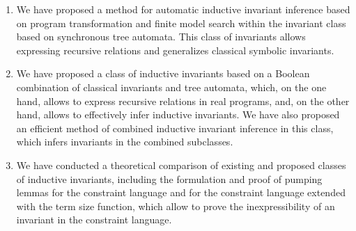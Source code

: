 \begin{enumerate}
\item We have proposed a method for automatic inductive invariant inference based on program transformation and finite model search within the invariant class based on synchronous tree automata. This class of invariants allows expressing recursive relations and generalizes classical symbolic invariants.
\item We have proposed a class of inductive invariants based on a Boolean combination of classical invariants and tree automata, which, on the one hand, allows to express recursive relations in real programs, and, on the other hand, allows to effectively infer inductive invariants. We have also proposed an efficient method of combined inductive invariant inference in this class, which infers invariants in the combined subclasses.
\item We have conducted a theoretical comparison of existing and proposed classes of inductive invariants, including the formulation and proof of pumping lemmas for the constraint language and for the constraint language extended with the term size function, which allow to prove the inexpressibility of an invariant in the constraint language.

\end{enumerate}
